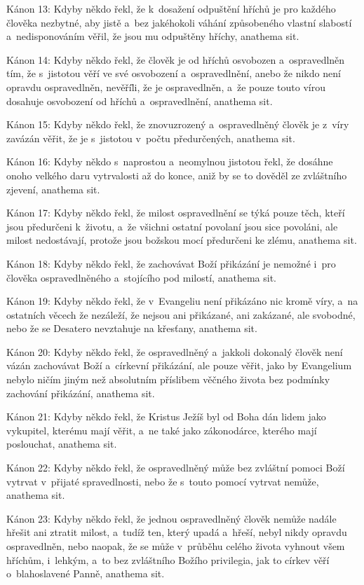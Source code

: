 \canon
Kánon 13: Kdyby někdo řekl, že k~dosažení odpuštění hříchů je pro každého člověka
nezbytné, aby jistě a~bez jakéhokoli váhání způsobeného vlastní slabostí a~nedisponováním
věřil, že jsou mu odpuštěny hříchy, anathema sit.

\canon
Kánon 14: Kdyby někdo řekl, že člověk je od hříchů osvobozen a~ospravedlněn tím,
že s~jistotou věří ve své osvobození a~ospravedlnění, anebo že nikdo není opravdu
ospravedlněn, nevěří\=li, že je ospravedlněn, a~že pouze touto vírou dosahuje osvobození
od hříchů a~ospravedlnění, anathema sit.

\canon
Kánon 15: Kdyby někdo řekl, že znovuzrozený a~ospravedlněný člověk je z~víry zavázán
věřit, že je s~jistotou v~počtu předurčených, anathema sit.

\canon
Kánon 16: Kdyby někdo s~naprostou a~neomylnou jistotou řekl, že dosáhne onoho velkého
daru vytrvalosti až do konce, aniž by se to dověděl ze zvláštního zjevení, anathema
sit.

\canon
Kánon 17: Kdyby někdo řekl, že milost ospravedlnění se týká pouze těch, kteří jsou
předurčeni k~životu, a~že všichni ostatní povolaní jsou sice povoláni, ale milost
nedostávají, protože jsou božskou mocí předurčeni ke zlému, anathema sit.

\canon
Kánon 18: Kdyby někdo řekl, že zachovávat Boží přikázání je nemožné i~pro člověka
ospravedlněného a~stojícího pod milostí, anathema sit.

\canon
Kánon 19: Kdyby někdo řekl, že v~Evangeliu není přikázáno nic kromě víry, a~na ostatních
věcech že nezáleží, že nejsou ani přikázané, ani zakázané, ale svobodné, nebo že
se Desatero nevztahuje na křesťany, anathema sit.

\canon
Kánon 20: Kdyby někdo řekl, že ospravedlněný a~jakkoli dokonalý člověk není vázán
zachovávat Boží a~církevní přikázání, ale pouze věřit, jako by Evangelium nebylo
ničím jiným než absolutním příslibem věčného života bez podmínky zachování přikázání,
anathema sit.

\canon
Kánon 21: Kdyby někdo řekl, že Kristus Ježíš byl od Boha dán lidem jako vykupitel,
kterému mají věřit, a~ne také jako zákonodárce, kterého mají poslouchat, anathema
sit.

\canon
Kánon 22: Kdyby někdo řekl, že ospravedlněný může bez zvláštní pomoci Boží vytrvat
v~přijaté spravedlnosti, nebo že s~touto pomocí vytrvat nemůže, anathema sit.

\canon
Kánon 23: Kdyby někdo řekl, že jednou ospravedlněný člověk nemůže nadále hřešit ani
ztratit milost, a~tudíž ten, který upadá a~hřeší, nebyl nikdy opravdu ospravedlněn,
nebo naopak, že se může v~průběhu celého života vyhnout všem hříchům, i~lehkým, a~to
bez zvláštního Božího privilegia, jak to církev věří o~blahoslavené Panně, anathema
sit.

